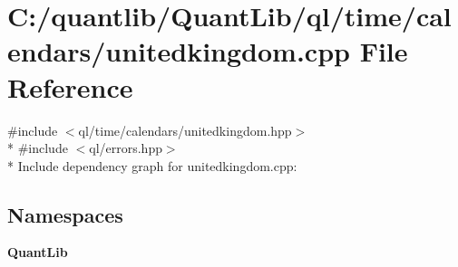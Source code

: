 \section{C\+:/quantlib/\+Quant\+Lib/ql/time/calendars/unitedkingdom.cpp File Reference}
\label{unitedkingdom_8cpp}
{\ttfamily \#include $<$ql/time/calendars/unitedkingdom.\+hpp$>$}\\*
{\ttfamily \#include $<$ql/errors.\+hpp$>$}\\*
Include dependency graph for unitedkingdom.\+cpp\+:
\subsection*{Namespaces}
\begin{DoxyCompactItemize}
\item 
 {\bf Quant\+Lib}
\end{DoxyCompactItemize}
